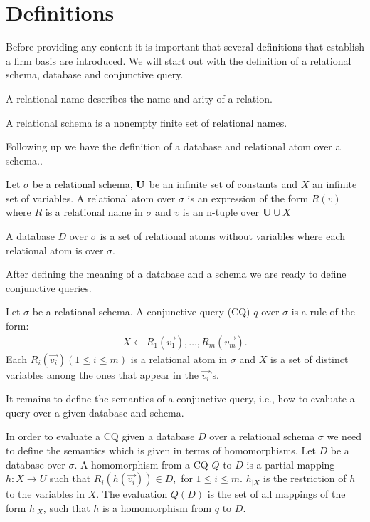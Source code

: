 \section{Definitions}

Before providing any content it is important that several definitions that
establish a firm basis are introduced. We will start out with the definition of a 
relational schema, database and conjunctive query. 

A relational name describes the name and arity of a relation.
\begin{definition}
	A relational schema is a nonempty finite set of relational names.
\end{definition}
Following up we have the definition of a database and relational atom over a
schema..

\begin{definition}
	Let $\sigma$ be a relational schema, 
	$\mathbf{U}$ be an infinite set of constants and $X$ an infinite set of variables.
	A relational atom over $\sigma$ is an expression of the form $R(v)$ where $R$
	is a relational name in $\sigma$ and $v$ is an n-tuple over $\mathbf{U} \cup X$

	A database $D$ over $\sigma$ is a set of relational atoms without variables
	where each relational atom is over $\sigma$.
\end{definition}

After defining the meaning of a database and a schema we are ready to define
conjunctive queries.

\begin{definition}
	Let $\sigma$ be a relational schema.
	A conjunctive query (CQ) $q$ over $\sigma$ is a rule of the form:
	\begin{align*}
		X \leftarrow R_1(\vec{v_1}), \dots, R_m(\vec{v_m}).
	\end{align*}
	Each $R_i(\vec{v_i}) (1\leq i \leq m)$ is a relational atom in $\sigma$ and 
	$X$ is a set of distinct variables among the ones that appear in the
	$\vec{v_i}$'s.
\end{definition}

It remains to define the semantics of a conjunctive query, i.e., how to evaluate
a query over a given database and schema.
\begin{definition}
	In order to evaluate a CQ given a database $D$ over a relational schema $\sigma$
	we need to define the semantics which is given in terms of homomorphisms.
	Let $D$ be a database over $\sigma$.  A homomorphism from a CQ $Q$ to $D$ is a
	partial mapping $h: X \rightarrow U$ such that $R_i(h(\vec{v_i})) \in D,$ for 
	$1 \leq i \leq m$. $h_{|X}$ is the restriction of $h$ to the variables in
	$X$. The evaluation $Q(D)$ is the set of all mappings of the form
	$h_{|X}$, such that $h$ is a homomorphism from $q$ to $D$.
\end{definition}

